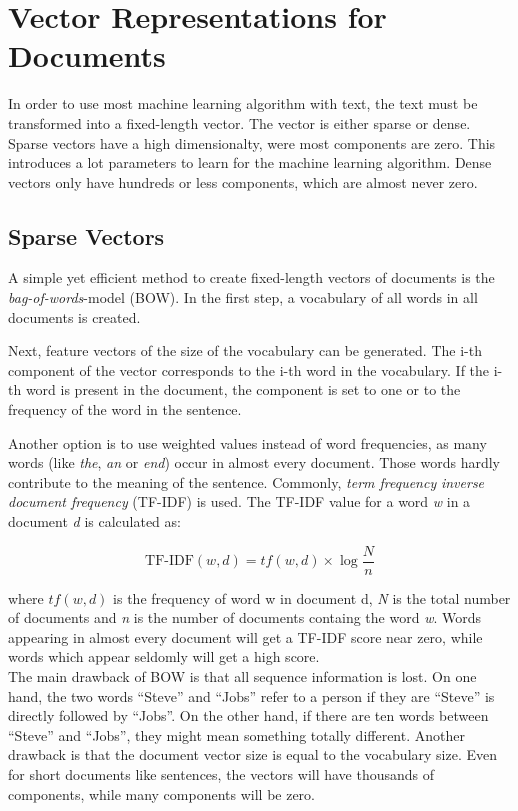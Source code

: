 \section{Vector Representations for Documents}
In order to use most machine learning algorithm with text, the text must be transformed into a fixed-length vector. The vector is either sparse or dense. Sparse vectors have a high dimensionalty, were most components are zero. This introduces a lot parameters to learn for the machine learning algorithm. Dense vectors only have hundreds or less components, which are almost never zero.

\subsection{Sparse Vectors}
\label{sec:bow_model}
A simple yet efficient method to create fixed-length vectors of documents is the \emph{bag-of-words}-model (BOW). In the first step, a vocabulary of all words in all documents is created.

Next, feature vectors of the size of the vocabulary can be generated. The i-th component of the vector corresponds to the i-th word in the vocabulary. If the i-th word is present in the document, the component is set to one or to the frequency of the word in the sentence.

Another option is to use weighted values instead of word frequencies, as many words (like \emph{the}, \emph{an} or \emph{end}) occur in almost every document. Those words hardly contribute to the meaning of the sentence.  Commonly, \emph{term frequency} \emph{inverse document frequency} (TF-IDF) is used. The TF-IDF value for a word \emph{w} in a document \emph{d} is calculated as:

\[\text{TF-IDF}(w,d) = tf(w,d) \times \log{\frac{N}{n}} \]

where $tf(w,d)$ is the frequency of word w in document d, \emph{N} is the total number of documents and \emph{n} is the number of documents containg the word \emph{w}. Words appearing in almost every document will get a TF-IDF score near zero, while words which appear seldomly will get a high score.\\

The main drawback of BOW is that all sequence information is lost. On one hand, the two words \enquote{Steve} and \enquote{Jobs} refer to a person if they are \enquote{Steve} is directly followed by \enquote{Jobs}. On the other hand, if there are ten words between \enquote{Steve} and \enquote{Jobs}, they might mean something totally different. Another drawback is that the document vector size is equal to the vocabulary size. Even for short documents like sentences, the vectors will have thousands of components, while many components will be zero.\\

